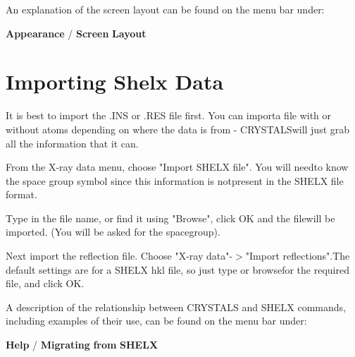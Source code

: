 \documentclass[10pt,a4paper]{report}
\begin{document}
An explanation of the screen layout can be found on the menu bar under:

{\bf Appearance} / {\bf Screen} {\bf Layout} 

\chapter{Importing Shelx Data}


 It is best to import the .INS or .RES file first. You can importa file with or without atoms depending on where the data is from - CRYSTALSwill just grab all the information that it can.

 From the X-ray data menu, choose "Import SHELX file". You will needto know the space group symbol since this information is notpresent in the SHELX file format.

 Type in the file name, or find it using "Browse", click OK and the filewill be imported. (You will be asked for the spacegroup).

 Next import the reflection file. Choose "X-ray data"-$>$"Import reflections".The default settings are for a SHELX hkl file, so just type or browsefor the required file, and click OK.



A description of the relationship between CRYSTALS and SHELX commands, including examples of their use, can be found on the menu bar under:

{\bf Help} / {\bf Migrating} {\bf from} {\bf SHELX} 

\printindex
\end{document}
